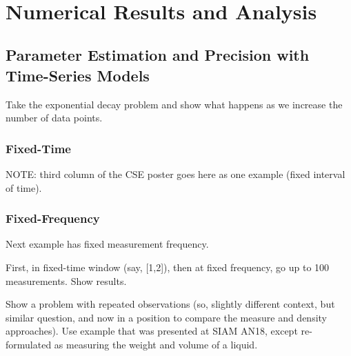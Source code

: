 \
\section{Numerical Results and Analysis}

\subsection{Parameter Estimation and Precision with Time-Series Models}
Take the exponential decay problem and show what happens as we increase the number of data points.

\subsubsection{Fixed-Time}
NOTE: third column of the CSE poster goes here as one example (fixed interval of time).

\subsubsection{Fixed-Frequency}
Next example has fixed measurement frequency.


First, in fixed-time window (say, [1,2]), then at fixed frequency, go up to 100 measurements. Show results.

Show a problem with repeated observations (so, slightly different context, but similar question, and now in a position to compare the measure and density approaches). Use example that was presented at SIAM AN18, except re-formulated as measuring the weight and volume of a liquid.
